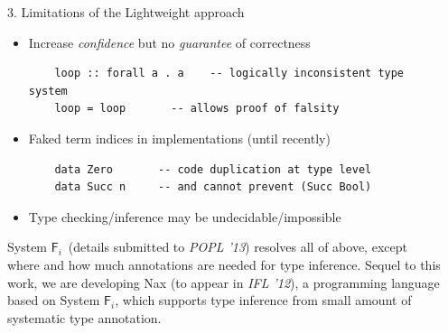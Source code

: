 \documentclass[final]{beamer}
\newcommand{\Fi}{\ensuremath{\mathsf{F}_{\!i}}}
\begin{document}
\begin{frame}[fragile]
\begin{columns}[t]
\begin{column}{.485\linewidth}
\begin{block}{3. Limitations of the Lightweight approach}
\begin{itemize}
\item Increase \emph{confidence} but no \emph{guarantee} of correctness
	\begin{lstlisting}
	loop :: forall a . a    -- logically inconsistent type system
	loop = loop       -- allows proof of falsity
	\end{lstlisting}
\item Faked term indices in implementations (until recently)
	\begin{lstlisting}
	data Zero       -- code duplication at type level
	data Succ n     -- and cannot prevent (Succ Bool)
	\end{lstlisting}
\item Type checking/inference may be undecidable/impossible
\end{itemize}
\begin{spacing}{1}\small
System \Fi\ (details submitted to \textit{POPL '13}) resolves all of above,
except where and how much annotations are needed for type inference.
Sequel to this work, we are developing Nax (to appear in \textit{IFL '12}),
a programming language based on System \Fi, which supports type inference
from small amount of systematic type annotation.
\end{spacing}
\end{block}

\end{column}
\begin{column}{.485\linewidth}


\end{column}
\end{columns}
\end{frame}
\end{document}
